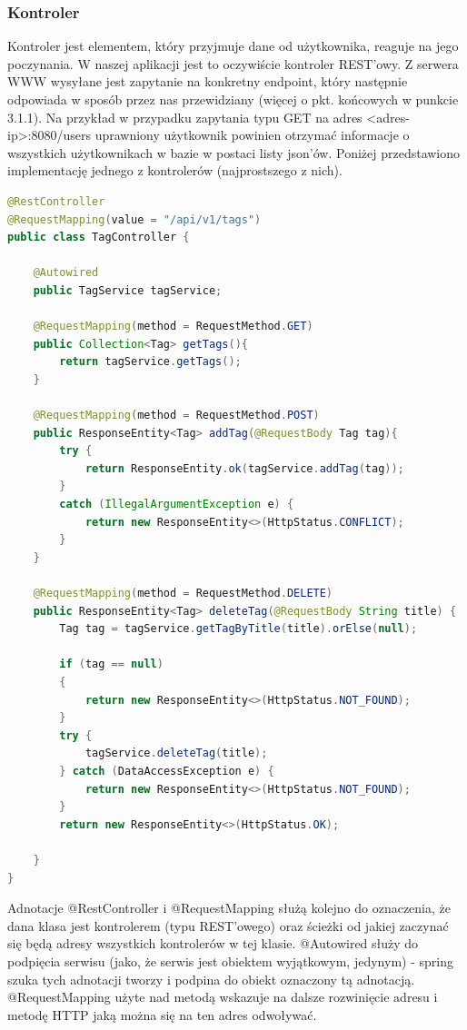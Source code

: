 \documentclass{report}
\begin{document}
			\subsubsection{Kontroler}
			
Kontroler jest elementem, który przyjmuje dane od użytkownika, reaguje na jego poczynania. W naszej aplikacji jest to oczywiście kontroler REST'owy. Z serwera WWW wysyłane jest zapytanie na konkretny endpoint, który następnie odpowiada w sposób przez nas przewidziany (więcej o pkt. końcowych w punkcie 3.1.1). Na przykład w przypadku zapytania typu GET na adres <adres-ip>:8080/users	uprawniony użytkownik powinien otrzymać informacje o wszystkich użytkownikach w bazie w postaci listy json'ów. Poniżej przedstawiono implementację jednego z kontrolerów (najprostszego z nich).


\begin{lstlisting}[language=Java, breaklines]
@RestController
@RequestMapping(value = "/api/v1/tags")
public class TagController {

    @Autowired
    public TagService tagService;

    @RequestMapping(method = RequestMethod.GET)
    public Collection<Tag> getTags(){
        return tagService.getTags();
    }

    @RequestMapping(method = RequestMethod.POST)
    public ResponseEntity<Tag> addTag(@RequestBody Tag tag){
        try {
            return ResponseEntity.ok(tagService.addTag(tag));
        }
        catch (IllegalArgumentException e) {
            return new ResponseEntity<>(HttpStatus.CONFLICT);
        }
    }

    @RequestMapping(method = RequestMethod.DELETE)
    public ResponseEntity<Tag> deleteTag(@RequestBody String title) {
        Tag tag = tagService.getTagByTitle(title).orElse(null);

        if (tag == null)
        {
            return new ResponseEntity<>(HttpStatus.NOT_FOUND);
        }
        try {
            tagService.deleteTag(title);
        } catch (DataAccessException e) {
            return new ResponseEntity<>(HttpStatus.NOT_FOUND);
        }
        return new ResponseEntity<>(HttpStatus.OK);

    }
}
\end{lstlisting}
			
Adnotacje @RestController i @RequestMapping służą kolejno do oznaczenia, że dana klasa jest kontrolerem (typu REST'owego) oraz ścieżki od jakiej zaczynać się będą adresy wszystkich kontrolerów w tej klasie. @Autowired służy do podpięcia serwisu (jako, że serwis jest obiektem wyjątkowym, jedynym) - spring szuka tych adnotacji tworzy i podpina do obiekt oznaczony tą adnotacją. @RequestMapping użyte nad metodą wskazuje na dalsze rozwinięcie adresu i metodę HTTP jaką można się na ten adres odwoływać.
\end{document}
